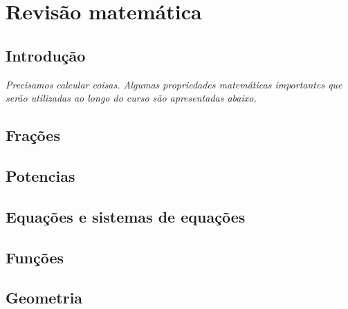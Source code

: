 \chapter{Revisão matemática}
\label{Chap:Review}



\section{Introdução}

{\it
Precisamos calcular coisas. Algumas propriedades matemáticas importantes que serão utilizadas ao longo do curso são apresentadas abaixo.
}

\section{Frações}

\section{Potencias}

\section{Equações e sistemas de equações}

\section{Funções}

\section{Geometria}


